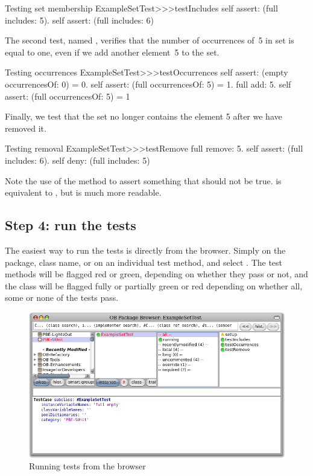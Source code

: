 \documentclass[a4paper,10pt,twoside]{book}
\begin{document}
\begin{method}[testIncludes]{Testing set membership}
ExampleSetTest>>>testIncludes
	self assert: (full includes: 5).
	self assert: (full includes: 6)
\end{method}

The second test, named , verifies that the
number of occurrences of~5 in  set is equal to one, even if we
add another element~5 to the set.

\begin{method}[testOccurrences]{Testing occurrences}
ExampleSetTest>>>testOccurrences
	self assert: (empty occurrencesOf: 0) = 0.
	self assert: (full occurrencesOf: 5) = 1.
	full add: 5.
	self assert: (full occurrencesOf: 5) = 1
\end{method}

Finally, we test that the set no
longer contains the element 5 after we have removed it.

\begin{method}[testRemove]{Testing removal}
ExampleSetTest>>>testRemove
	full remove: 5.
	self assert: (full includes: 6).
	self deny: (full includes: 5)
\end{method}

\noindent
Note the use of the method  to assert something that should not be true.
 is equivalent to , but is much more readable.
\subsection{Step 4: run the tests}

The easiest way to run the tests is directly from the browser.  Simply \actclick on the package, class name, or on an individual test method, and select .
The test methods will be flagged red or green, depending on whether they pass or not, and the class will be flagged fully or partially green or red depending on whether all, some or none of the tests pass.

\begin{figure}[tbh]
  \begin{center}
	\includegraphics[width=\linewidth]{browser-tests}
	\caption{Running \sunit tests from the browser}
  \end{center}
\end{figure}
\end{document}
